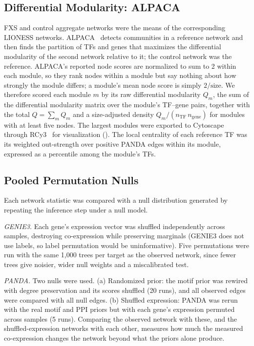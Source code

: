 \documentclass[journal]{IEEEtran}
\begin{document}
\subsection{Differential Modularity: ALPACA}
FXS and control aggregate networks were the means of the corresponding LIONESS networks. ALPACA~\cite{alpaca} detects communities in a reference network and then finds the partition of TFs and genes that maximizes the differential modularity of the second network relative to it; the control network was the reference. ALPACA's reported node scores are normalized to sum to 2 within each module, so they rank nodes within a module but say nothing about how strongly the module differs; a module's mean node score is simply $2/\text{size}$. We therefore scored each module $m$ by its raw differential modularity $Q_m$, the sum of the differential modularity matrix over the module's TF--gene pairs, together with the total $Q=\sum_m Q_m$ and a size-adjusted density $Q_m/(n_{\text{TF}}\,n_{\text{gene}})$ for modules with at least five nodes. The largest modules were exported to Cytoscape~\cite{cytoscape} through RCy3~\cite{rcy3} for visualization (). The local centrality of each reference TF was its weighted out-strength over positive PANDA edges within its module, expressed as a percentile among the module's TFs.

\subsection{Pooled Permutation Nulls}\label{sec:nulls}
Each network statistic was compared with a null distribution generated by repeating the inference step under a null model.

\emph{GENIE3.} Each gene's expression vector was shuffled independently across samples, destroying co-expression while preserving marginals (GENIE3 does not use labels, so label permutation would be uninformative). Five permutations were run with the same 1,000 trees per target as the observed network, since fewer trees give noisier, wider null weights and a miscalibrated test.

\emph{PANDA.} Two nulls were used. (a) Randomized prior: the motif prior was rewired with degree preservation and its scores shuffled (20 runs), and all observed edges were compared with all null edges. (b) Shuffled expression: PANDA was rerun with the real motif and PPI priors but with each gene's expression permuted across samples (5 runs). Comparing the observed network with these, and the shuffled-expression networks with each other, measures how much the measured co-expression changes the network beyond what the priors alone produce.
\end{document}
